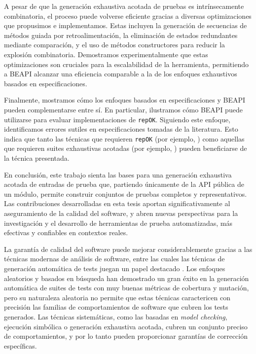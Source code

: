 A pesar de que la generación exhaustiva acotada de pruebas es intrínsecamente combinatoria, 
el proceso puede volverse eficiente gracias a diversas optimizaciones que propusimos e implementamos. 
Estas incluyen la generación de secuencias de métodos guiada por retroalimentación, la eliminación de estados redundantes mediante comparación, 
y el uso de métodos constructores para reducir la explosión combinatoria. 
Demostramos experimentalmente que estas optimizaciones son cruciales para la escalabilidad de la herramienta, 
permitiendo a BEAPI alcanzar una eficiencia comparable a la de los enfoques exhaustivos basados en especificaciones.

Finalmente, mostramos cómo los enfoques basados en especificaciones y BEAPI pueden complementarse entre sí. 
En particular, ilustramos cómo BEAPI puede utilizarse para evaluar implementaciones de \texttt{repOK}. 
Siguiendo este enfoque, identificamos errores sutiles en especificaciones tomadas de la literatura. 
Esto indica que tanto las técnicas que requieren \texttt{repOK} (por ejemplo, \cite{Rosner15}) como aquellas que requieren suites exhaustivas acotadas (por ejemplo, \cite{Molina+2021}) 
pueden beneficiarse de la técnica presentada.

En conclusión, este trabajo sienta las bases para una generación exhaustiva acotada de entradas de prueba que, 
partiendo únicamente de la API pública de un módulo, permite construir conjuntos de pruebas completos y representativos. 
Las contribuciones desarrolladas en esta tesis aportan significativamente al aseguramiento de la calidad del software, 
y abren nuevas perspectivas para la investigación y el desarrollo de herramientas de prueba automatizadas, 
más efectivas y confiables en contextos reales.



La garantía de calidad del software puede mejorar considerablemente gracias a las técnicas modernas de análisis de software, 
entre las cuales las técnicas de generación automática de tests juegan un papel destacado \cite{Cadar08, Luckow14, Fraser11, Pacheco07, Ma15, goGodefroid05, Marinov01, Boyapati02,Godefroid12}. 
Los enfoques aleatorios y basados en búsqueda han demostrado un gran éxito en la generación automática de suites de tests con muy buenas métricas de cobertura y mutación, 
pero su naturaleza aleatoria no permite que estas técnicas caractericen con precisión las familias de comportamientos de software 
que cubren los tests generados. Las técnicas sistemáticas, como las basadas en \emph{model checking}, ejecución simbólica 
o generación exhaustiva acotada, cubren un conjunto preciso de comportamientos, y por lo tanto pueden proporcionar garantías de corrección específicas.

